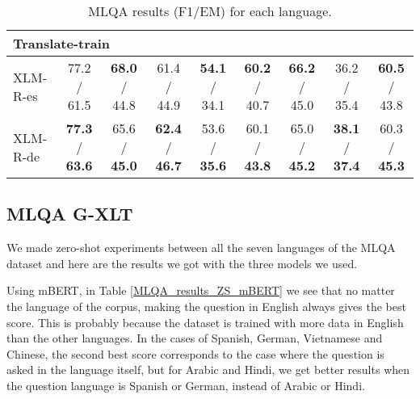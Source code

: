 \documentclass[11pt]{article}
\begin{document}
\begin{table*}[!ht]
\begin{adjustbox}{max width=\textwidth}
\begin{tabular}{l|ccccccc|c}
        \midrule
        \multicolumn{9}{l}{Translate-train} \\
        \midrule
        XLM-R-es &77.2 / 61.5 & \textbf{68.0} / 44.8 & 61.4 / 44.9 & \textbf{54.1} / 34.1 & \textbf{60.2} / 40.7 & \textbf{66.2} / 45.0 & 36.2 / 35.4 & \textbf{60.5} / 43.8 \\
        XLM-R-de & \textbf{77.3} / \textbf{63.6} & 65.6 / \textbf{45.0} & \textbf{62.4} / \textbf{46.7} & 53.6 / \textbf{35.6} & 60.1 / \textbf{43.8} & 65.0 / \textbf{45.2} & \textbf{38.1} / \textbf{37.4} & 60.3 / \textbf{45.3}\\
        \bottomrule
    \end{tabular}
    \end{adjustbox}
    \centering
    \caption{MLQA results (F1/EM) for each language.}
    \label{MLQA_results}
\end{table*}

\subsection{MLQA G-XLT}

We made zero-shot experiments between all the seven languages of the MLQA dataset and here are the results we got with the three models we used.

Using mBERT, in Table \ref{MLQA_results_ZS_mBERT} we see that no matter the language of the corpus, making the question in English always gives the best score. This is probably because the dataset is trained with more data in English than the other languages. In the cases of Spanish, German, Vietnamese and Chinese, the second best score corresponds to the case where the question is asked in the language itself, but for Arabic and Hindi, we get better results when the question language is Spanish or German, instead of Arabic or Hindi.
\end{document}
